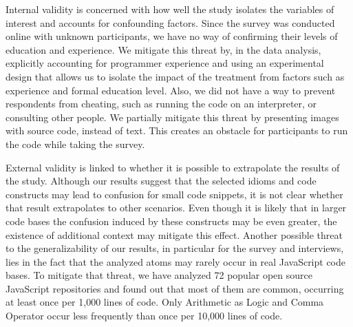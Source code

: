 

Internal validity is concerned with how well the study isolates the variables of interest and accounts for confounding factors. Since the survey was conducted online with unknown participants, we have no way of confirming their levels of education and experience. We mitigate this threat by, in the data analysis, explicitly accounting for programmer experience and using an experimental design that allows us to isolate the impact of the treatment from factors such as experience and formal education level. Also, we did not have a way to prevent respondents from cheating, such as running the code on an interpreter, or consulting other people. We partially mitigate this threat by presenting images with source code, instead of text. This creates an obstacle for participants to run the code while taking the survey.

External validity is linked to whether it is possible to extrapolate the results of the study. Although our results suggest that the selected idioms and code constructs may lead to confusion for small code snippets, it is not clear whether that result extrapolates to other scenarios. Even though it is likely that in larger code bases the confusion induced by these constructs may be even greater, the existence of additional context may mitigate this effect. Another possible threat to the generalizability of our results, in particular for the survey and interviews, lies in the fact that the analyzed atoms may rarely occur in real JavaScript code bases. To mitigate that threat, we have analyzed 72 popular open source JavaScript repositories and found out that most of them are common, occurring at least once per 1,000 lines of code. Only Arithmetic as Logic and Comma Operator occur less frequently than once per 10,000 lines of code. 


